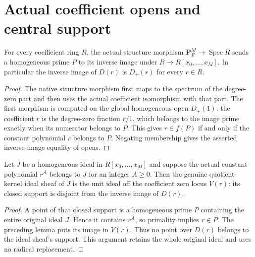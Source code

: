 \section{Actual coefficient opens and central support}

\begin{lemma}
\label{projective:native-coefficient-basic-opens}
\leanok
For every coefficient ring $R$, the actual structure morphism
$\mathbf P^M_R\to\operatorname{Spec}R$ sends a homogeneous prime $P$
to its inverse image under $R\to R[x_0,\ldots,x_M]$.  In particular the
inverse image of $D(r)$ is $D_+(r)$ for every $r\in R$.
\end{lemma}
\begin{proof}
The native structure morphism first maps to the spectrum of the degree-zero
part and then uses the actual coefficient isomorphism with that part.
The first morphism is computed on the global homogeneous open $D_+(1)$:
the coefficient $r$ is the degree-zero fraction $r/1$, which belongs to
the image prime exactly when its numerator belongs to $P$.  This gives
$r\in f(P)$ if and only if the constant polynomial $r$ belongs to $P$.
Negating membership gives the asserted inverse-image equality of opens.
\end{proof}

\begin{lemma}
\label{projective:coefficient-power-central-support}
\leanok
Let $J$ be a homogeneous ideal in $R[x_0,\ldots,x_M]$ and suppose the
actual constant polynomial $r^A$ belongs to $J$ for an integer $A\ge0$.
Then the genuine quotient-kernel ideal sheaf of $J$ is the unit ideal
off the coefficient zero locus $V(r)$: its closed support is disjoint
from the inverse image of $D(r)$.
\end{lemma}
\begin{proof}
A point of that closed support is a homogeneous prime $P$ containing the
entire original ideal $J$.  Hence it contains $r^A$, so primality implies
$r\in P$.  The preceding lemma puts its image in $V(r)$.  Thus no point
over $D(r)$ belongs to the ideal sheaf's support.  This argument retains
the whole original ideal and uses no radical replacement.
\end{proof}
